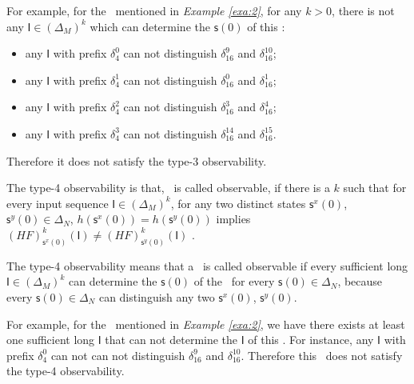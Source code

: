 \begin{example}
For example, for the \BCN\ mentioned in {\em Example \ref{exa:2}}, for any $k>0$, there is not any $\mathsf{I}\in(\Delta_M)^k$ which can determine the $\mathsf{s}(0)$ of this \BCN:
\begin{itemize}
  \item any $\mathsf{I}$ with prefix $\delta_{4}^0$ can not distinguish $\delta_{16}^9$ and $\delta_{16}^{10}$;
  \item any $\mathsf{I}$ with prefix $\delta_{4}^1$ can not distinguish $\delta_{16}^0$ and $\delta_{16}^{1}$;
  \item any $\mathsf{I}$ with prefix $\delta_{4}^2$ can not distinguish $\delta_{16}^3$ and $\delta_{16}^{4}$;
  \item any $\mathsf{I}$ with prefix $\delta_{4}^3$ can not distinguish $\delta_{16}^{14}$ and $\delta_{16}^{15}$.
\end{itemize} 
Therefore it does not satisfy the type-3 observability. 
\label{exa:6}
\end{example}  
\begin{definition}
	The type-4 observability is that, \BCN\ is called observable, if there is a $k$ such that for every input sequence $\mathsf{I}\in(\Delta_M)^{k}$, for any two distinct states $\mathsf{s}^{x}(0)$, $\mathsf{s}^{y}(0) \in \Delta_N$, $h(\mathsf{s}^{x}(0))=h(\mathsf{s}^{y}(0))$ implies $(HF)^{k}_{\mathsf{s}^{x}(0)}(\mathsf{I})\neq (HF)^{k}_{\mathsf{s}^{y}(0)}(\mathsf{I})$ \cite{Fornasini2013Observability}.
\end{definition}

The type-4 observability means that a \BCN\ is called observable if every sufficient long $\mathsf{I}\in(\Delta_M)^{k}$ can determine the $\mathsf{s}(0)$ of the \BCN\ for every $\mathsf{s}(0)\in\Delta_N$, because every $\mathsf{s}(0)\in\Delta_N$ can distinguish any two $\mathsf{s}^{x}(0)$, $\mathsf{s}^{y}(0)$.%
\begin{example}
For example, for the \BCN\ mentioned in {\em Example \ref{exa:2}}, we have there exists at least one sufficient long $\mathsf{I}$ that can not determine the $\mathsf{I}$ of this \BCN. For instance, any $\mathsf{I}$ with prefix $\delta_{4}^0$ can not can not distinguish $\delta_{16}^9$ and $\delta_{16}^{10}$. 
Therefore this \BCN\ does not satisfy the type-4 observability. 
\label{exa:7}
\end{example}  

